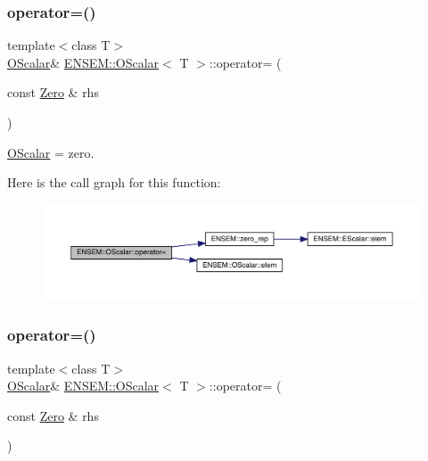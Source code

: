 \subsubsection{\texorpdfstring{operator=()}{operator=()}\hspace{0.1cm}{\footnotesize\ttfamily [5/12]}}
{\footnotesize\ttfamily template$<$class T$>$ \\
\mbox{\hyperlink{classENSEM_1_1OScalar}{O\+Scalar}}\& \mbox{\hyperlink{classENSEM_1_1OScalar}{E\+N\+S\+E\+M\+::\+O\+Scalar}}$<$ T $>$\+::operator= (\begin{DoxyParamCaption}\item[{const \mbox{\hyperlink{structENSEM_1_1Zero}{Zero}} \&}]{rhs }\end{DoxyParamCaption})\hspace{0.3cm}{\ttfamily [inline]}}



\mbox{\hyperlink{classENSEM_1_1OScalar}{O\+Scalar}} = zero. 

Here is the call graph for this function\+:
\nopagebreak
\begin{figure}[H]
\begin{center}
\leavevmode
\includegraphics[width=350pt]{da/d80/classENSEM_1_1OScalar_a4fdfed29e219b358e05588826e672932_cgraph}
\end{center}
\end{figure}
\mbox{\label{classENSEM_1_1OScalar_a4fdfed29e219b358e05588826e672932}} 
\subsubsection{\texorpdfstring{operator=()}{operator=()}\hspace{0.1cm}{\footnotesize\ttfamily [6/12]}}
{\footnotesize\ttfamily template$<$class T$>$ \\
\mbox{\hyperlink{classENSEM_1_1OScalar}{O\+Scalar}}\& \mbox{\hyperlink{classENSEM_1_1OScalar}{E\+N\+S\+E\+M\+::\+O\+Scalar}}$<$ T $>$\+::operator= (\begin{DoxyParamCaption}\item[{const \mbox{\hyperlink{structENSEM_1_1Zero}{Zero}} \&}]{rhs }\end{DoxyParamCaption})\hspace{0.3cm}{\ttfamily [inline]}}



